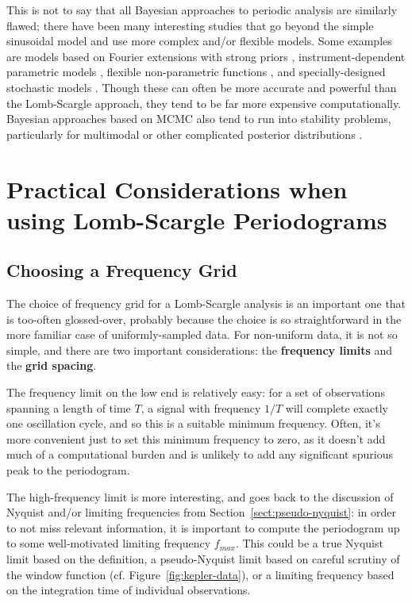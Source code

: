 \documentclass[preprint]{aastex}
\newcommand{\fig}[1]{Figure~\ref{fig:#1}}
\newcommand{\Sect}[1]{Section~\ref{sect:#1}}
\newcommand{\sect}[1]{\Sect{#1}}
\newcommand{\sectlabel}[1]{\label{sect:#1}}
\begin{document}
This is not to say that all Bayesian approaches to periodic analysis are
similarly flawed; there have been many interesting studies that go beyond
the simple sinusoidal model and use more complex and/or flexible models.
Some examples are models based on Fourier
extensions with strong priors \citep[e.g.][]{Bretthorst88},
instrument-dependent parametric models \citep[e.g.][]{Angus16},
flexible non-parametric functions \citep[e.g.][]{Gregory92}, and
specially-designed stochastic models \citep[e.g.][]{Kelly14}.
Though these can often be more accurate and powerful than the Lomb-Scargle
approach, they tend to be far more expensive computationally.
Bayesian approaches based on MCMC also tend to run into stability problems,
particularly for multimodal or other complicated posterior distributions
\citep[See, for example, the RR Lyrae discussion in][]{Kelly14}.


\section{Practical Considerations when using Lomb-Scargle Periodograms}
\sectlabel{practical-considerations}

\subsection{Choosing a Frequency Grid}
\sectlabel{frequency-grid}
The choice of frequency grid for a Lomb-Scargle analysis is an important one
that is too-often glossed-over, probably because the choice is so
straightforward in the more familiar case of uniformly-sampled data.
For non-uniform data, it is not so simple, and there are two important
considerations: the {\bf frequency limits} and the {\bf grid spacing}.

The frequency limit on the low end is relatively easy: for a set of observations
spanning a length of time $T$,
a signal with frequency $1/T$ will complete exactly one oscillation cycle,
and so this is a suitable minimum frequency.
Often, it's more convenient just to set this minimum frequency to zero, as it
doesn't add much of a computational burden and is unlikely to add any
significant spurious peak to the periodogram.

The high-frequency limit is more interesting, and goes back to the discussion
of Nyquist and/or limiting frequencies from \sect{pseudo-nyquist}:
in order to not miss relevant information, it is important to compute the
periodogram up to some well-motivated limiting frequency $f_{max}$. This could
be a true Nyquist limit based on the \citep{Eyer99} definition, a pseudo-Nyquist
limit based on careful scrutiny of the window function (cf. \fig{kepler-data}),
or a limiting frequency based on the integration time of individual
observations.
\end{document}
